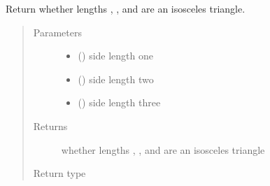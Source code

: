 \documentclass[letterpaper,10pt,english]{sphinxmanual}
\begin{document}
\begin{fulllineitems}
\label{\detokenize{api:trianglelib.utils.is_isosceles}}
Return whether lengths , , and  are an isosceles triangle.
\begin{quote}\begin{description}
\item[{Parameters}] \leavevmode\begin{itemize}
\item {} 
 () \textendash{} side length one

\item {} 
 () \textendash{} side length two

\item {} 
 () \textendash{} side length three

\end{itemize}

\item[{Returns}] \leavevmode
whether lengths , , and  are an isosceles triangle

\item[{Return type}] \leavevmode
{}

\end{description}\end{quote}

\end{fulllineitems}

\end{document}
